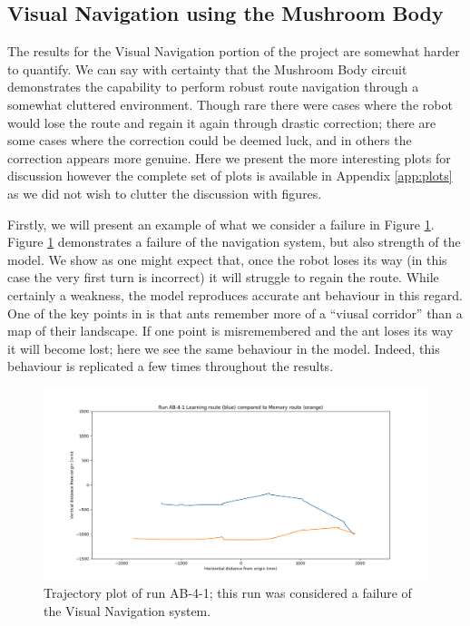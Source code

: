 \documentclass[a4paper,12pt,twoside,openright]{article}
\begin{document}
\subsection{Visual Navigation using the Mushroom Body}
The results for the Visual Navigation portion of the project are somewhat harder to quantify. We can say with certainty that the Mushroom Body circuit
demonstrates the capability to perform robust route navigation through a somewhat cluttered environment. Though rare there were cases where the robot would
lose the route and regain it again through drastic correction; there are some cases where the correction could be deemed luck, and in others the correction
appears more genuine. Here we present the more interesting plots for discussion however the complete set of plots is available in Appendix \ref{app:plots}
as we did not wish to clutter the discussion with figures. 
\newline

Firstly, we will present an example of what we consider a failure in Figure \ref{fig:ab-4-1-fail}. Figure \ref{fig:ab-4-1-fail}
demonstrates a failure of the navigation system, but also strength of the model. We show as one might expect that, once the
robot loses its way (in this case the very first turn is incorrect) it will struggle to regain the route. While certainly a
weakness, the model reproduces accurate ant behaviour in this regard. One of the key points in \cite{Wehner2006} is that
ants remember more of a ``viusal corridor'' than a map of their landscape. If one point is misremembered and the ant loses
its way it will become lost; here we see the same behaviour in the model. Indeed, this behaviour is replicated a few times
throughout the results.

\begin{figure}
 \centering
  \includegraphics[width=\textwidth]{AB-4-1}
  \caption{
    \label{fig:ab-4-1-fail} Trajectory plot of run AB-4-1; this run was considered a failure of the
    Visual Navigation system.
  }
\end{figure}
\end{document}
